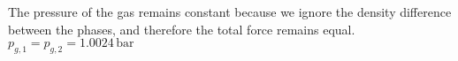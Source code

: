 The pressure of the gas remains constant because we ignore the density difference between the phases, and therefore the total force remains equal.  
\( p_{g,1} = p_{g,2} = 1.0024 \, \text{bar} \)